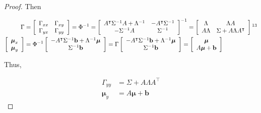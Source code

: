 \begin{proof}
    Then

    \begin{align}
        \Gamma&=\left[\begin{array}{cc}
                         \Gamma_{xx}&\Gamma_{xy}\\
                         \Gamma_{yx}&\Gamma_{yy}
                     \end{array}\right]=
        \Phi^{-1}=\left[\begin{array}{cc}
                                    A^\intercal\Sigma^{-1}A+\Lambda^{-1}&-A^\intercal\Sigma^{-1}\\
                                    -\Sigma^{-1}A&\Sigma^{-1}
                                \end{array}\right]^{-1}
                        =\left[\begin{array}{cc}
                            \Lambda&\Lambda A\\
                                    A\Lambda&\Sigma+A\Lambda A^\intercal
                                \end{array}\right]\footnotemark[13]\label{eq:Gamma_final}\\
        \left[\begin{array}{c}\boldsymbol{\mu}_x\\\boldsymbol{\mu}_y\end{array}\right]&=
            \Phi^{-1}\left[\begin{array}{c}
                      -A^\intercal\Sigma^{-1}\mathbf{b}+\Lambda^{-1}\boldsymbol{\mu}\\
                      \Sigma^{-1}\mathbf{b}
                  \end{array}\right]=
            \Gamma\left[\begin{array}{c}
                      -A^\intercal\Sigma^{-1}\mathbf{b}+\Lambda^{-1}\boldsymbol{\mu}\\
                      \Sigma^{-1}\mathbf{b}
                  \end{array}\right]
                  =\left[\begin{array}{c}
                              \boldsymbol{\mu}\\
                              A\boldsymbol{\mu}+\mathbf{b}
                          \end{array}\right]\nonumber
    \end{align}

    Thus,

    \begin{align*}
        \Gamma_{yy}&=\Sigma+A\Lambda A^\intercal\\
        \boldsymbol{\mu}_y&=A\boldsymbol{\mu}+\mathbf{b}
    \end{align*}

\end{proof}

